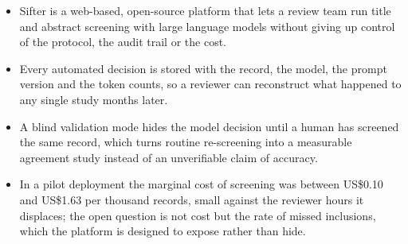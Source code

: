 \documentclass[journal=rsm]{CUP-JNL-DTM}
\begin{document}
\begin{itemize}
\item Sifter is a web-based, open-source platform that lets a review team run
title and abstract screening with large language models without giving up
control of the protocol, the audit trail or the cost.
\item Every automated decision is stored with the record, the model, the prompt
version and the token counts, so a reviewer can reconstruct what happened to
any single study months later.
\item A blind validation mode hides the model decision until a human has
screened the same record, which turns routine re-screening into a measurable
agreement study instead of an unverifiable claim of accuracy.
\item In a pilot deployment the marginal cost of screening was between US\$0.10
and US\$1.63 per thousand records, small against the reviewer hours it
displaces; the open question is not cost but the rate of missed inclusions,
which the platform is designed to expose rather than hide.

\end{itemize}








\begin{Backmatter}
\printbibliography
\end{Backmatter}
\end{document}
